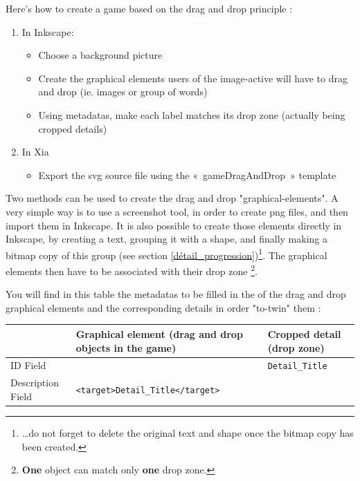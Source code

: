 
Here's how to create a game based on the drag and drop principle :
\begin{enumerate}
 \item In Inkscape:
\begin{itemize}
 \item Choose a background picture
 \item Create the graphical elements users of the image-active will have to drag and drop (ie. images or group of words)
 \item Using metadatas, make each label matches its drop zone (actually being cropped details)
\end{itemize}
 \item In Xia
 \begin{itemize}
  \item Export the svg source file using the «~gameDragAndDrop~» template
 \end{itemize}
\end{enumerate}

Two methods can be used to create the drag and drop "graphical-elements".
A very simple way is to use a screenshot tool, in order to create png files, and then import them in Inkscape.
It is also possible to create those elements directly in Inkscape, by creating a text, grouping it with a shape,
and finally making a bitmap copy of this group 
(see section \ref{détail_progression})\footnote{\ldots do not forget to delete
the original text and shape once the bitmap copy has been created.}.
The graphical elements then have to be associated with their drop zone \footnote{\textbf{One} object can match only \textbf{one} drop zone.}.

You will find in this table the metadatas to be filled in the  
of the drag and drop graphical elements and the corresponding details in order "to-twin" them :

\begin{center}
\begin{tabular}{|p{}|p{2.5in}|p{1.5in}|}
\hline
 & Graphical element (drag and drop objects in the game) & Cropped detail (drop zone)\\
\hline
ID Field & & \verb|Detail_Title|\\
\hline
Description Field & \verb|<target>Detail_Title</target>| & \\
\hline
\end{tabular}
\end{center}

